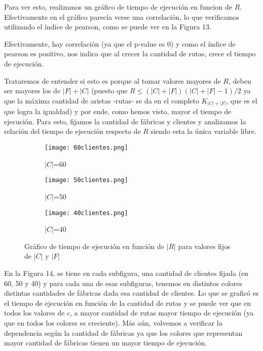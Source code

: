 \documentclass[A4paper,oneside,fleqn,11pt]{article}
\theoremstyle{definition}
\begin{document}
 Para ver esto, realizamos un gráfico de tiempo de ejecución en funcion de $R$. Efectivamente en el gráfico parecía verse una correlación, lo que verificamos utilizando el índice de pearson, como se puede ver en la Figura 13.


Efectivamente, hay correlación (ya que el p-value es 0) y como el índice de pearson es positivo, nos indica que al crecer la cantidad de rutas, crece el tiempo de ejecución. 

Trataremos de entender si esto es porque al tomar valores mayores de $R$, deben ser mayores los de $|F|+|C|$ (puesto que $R \leq (|C|+|F|)(|C|+|F|-1)/2$ ya que la m\'axima cantidad de aristas -rutas- se da en el completo $K_{|C|+|F|}$, que es el que logra la igualdad) y por ende, como hemos visto, mayor el tiempo de ejecución. Para esto, fijamos la cantidad de fábricas y clientes y analizamos la relación del tiempo de ejecución respecto de $R$ siendo esta la única variable libre.

\vspace{15mm}

\begin{figure}[h!] %
    \begin{subfigure}[b]{0.3\textwidth}
        \texttt{[image: 60clientes.png]}
        \caption[center]{$|C|$=60}
        \label{ni se pa que sirve esto}
    \end{subfigure}
    \begin{subfigure}[b]{0.3\textwidth}
        \texttt{[image: 50clientes.png]}
        \caption{$|C|$=50}
        \label{ni se pa que sirve esto}
    \end{subfigure}
	\begin{subfigure}[b]{0.3\textwidth}
        \texttt{[image: 40clientes.png]}
        \caption{$|C|$=40}
        \label{ni se pa que sirve esto}
    \end{subfigure}    
    \caption{Gráfico de tiempo de ejecución en función de $|R|$ para valores fijos de $|C|$ y $|F|$}
\end{figure}

En la Figura 14, se tiene en cada subfigura, una cantidad de clientes fijada (en 60, 50 y 40) y para cada una de esas subfiguras, tenemos en distintos colores distintas cantidades de fábricas dada esa cantidad de clientes. Lo que se graficó es el tiempo de ejecución en función de la cantidad de rutas y se puede ver que en todos los valores de $c$, a mayor cantidad de rutas mayor tiempo de ejecución (ya que en todos los colores es creciente). Más aún, volvemos a verificar la dependencia según la cantidad de fábricas ya que los colores que representan mayor cantidad de fábricas tienen un mayor tiempo de ejecución.
\end{document}
